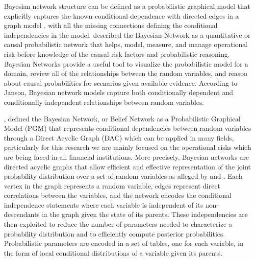 Bayesian network structure can be defined as a probabilistic graphical model that explicitly captures the known conditional dependence with directed edges in a graph model \parencite{janson2019bayesian}, with all the missing connections defining the conditional independencies in the model. \textcite{ramamurthy2005operational} described the Bayesian Network as a quantitative or causal probabilistic network that helps, model, measure, and manage operational risk before knowledge of the causal risk factors and probabilistic reasoning. Bayesian Networks provide a useful tool to visualize the probabilistic model for a domain, review all of the relationships between the random variables, and reason about causal probabilities for scenarios given available evidence. According to Janson, Bayesian network models capture both conditionally dependent and conditionally independent relationships between random variables. 

\textcite{guney2019introduction}, defined the Bayesian Network, or Belief Network as a Probabilistic Graphical Model (PGM) that represents conditional dependencies between random variables through a Direct Acyclic Graph (DAC) which can be applied in many fields, particularly for this research we are mainly focused on the operational risks which are being faced in all financial institutions. More precisely, Bayesian networks are directed acyclic graphs that allow efficient and effective representation of the joint probability distribution over a set of random variables as alleged by \textcite{fenton2008using} and \textcite{leo2020managing}. Each vertex in the graph represents a random variable, edges represent direct correlations between the variables, and the network encodes the conditional independence statements where each variable is independent of its non-descendants in the graph given the state of its parents. These independencies are then exploited to reduce the number of parameters needed to characterize a probability distribution and to efficiently compute posterior probabilities. Probabilistic parameters are encoded in a set of tables, one for each variable, in the form of local conditional distributions of a variable given its parents. 

